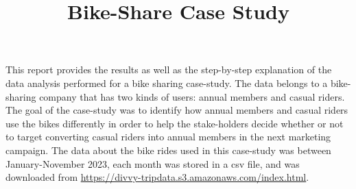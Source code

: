 \documentclass[12pt]{article}
\begin{document}
\title{Bike-Share Case Study}
\date{}
\maketitle

This report provides the results as well as the step-by-step explanation of the data analysis performed for a bike sharing case-study. The data belongs to a bike-sharing company that has two kinds of users: annual members and casual riders. The goal of the case-study was to identify how annual members and casual riders use the bikes differently in order to help the stake-holders decide whether or not to target converting casual riders into annual members in the next marketing campaign. The data about the bike rides used in this case-study was between January-November 2023, each month was stored in a csv file, and was downloaded from \url{https://divvy-tripdata.s3.amazonaws.com/index.html}. 
\end{document}
